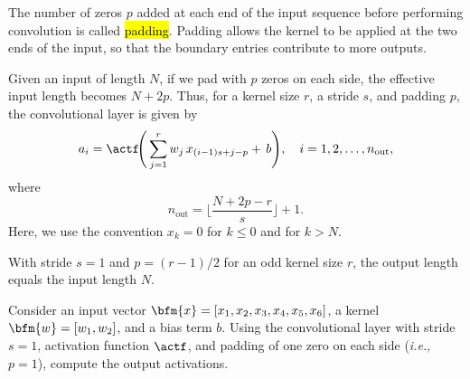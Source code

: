 \begin{remark}[Padding] 
The number of zeros $p$ added at each end of the input sequence before performing convolution is called \hl{padding}.
Padding allows the kernel to be applied at the two ends of the input, so that the boundary entries contribute to more outputs. 
 
Given an input of length $N$, if we pad with $p$ zeros on each side, the effective input length becomes $N + 2p$.  Thus, for a kernel size $r$, a stride $s$, and padding $p$, 
the convolutional layer is given by
$$
a_i = \actf\!\Bigg(\sum_{j=1}^{r} w_j\, x_{(i-1)s + j - p}+\,b\Bigg),
\quad i = 1, 2, \ldots, n_{\text{out}},
$$
where
$$
n_{\text{out}} = \Bigg\lfloor \frac{N + 2p - r}{s} \Bigg\rfloor + 1.
$$
Here, we use the convention $x_k = 0$ for $k \le 0$ and for $k > N$.

With stride $s=1$ and $p=(r-1)/2$ for an odd kernel size $r$, the output length equals the input length $N$.
\end{remark}
\begin{problem}
Consider an input vector $\bfm{x} = [x_1, x_2, x_3, x_4, x_5, x_6]$, 
a kernel $\bfm{w} = [w_1, w_2]$, and a bias term $b$.
Using the convolutional layer with stride $s = 1$, 
activation function $\actf$, and padding of one zero on each side 
(\emph{i.e.}, $p=1$), compute the output activations.
\end{problem}

